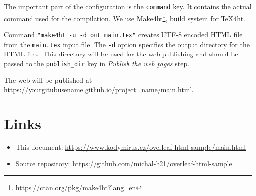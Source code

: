 \documentclass{article}
\newcommand{\1}{\mathbbm{1}}
\newcommand{\cmdname}[1]{\texttt{#1}}
\newcommand\footurl[1]{\footnote{\url{#1}}}
\newcommand\urllink[2]{#1\footurl{#2}}
\begin{document}
The important part of the configuration is the \cmdname{command} key. It
contains the actual command used for the compilation. We use
\urllink{Make4ht}{https://ctan.org/pkg/make4ht?lang=en}, build system for
\TeX4ht.

Command \verb|"make4ht -u -d out main.tex"| creates UTF-8 encoded HTML file
from the \cmdname{main.tex} input file. The \texttt{-d} option specifies the
output directory for the HTML files. This directory will be used for the web
publishing and should be passed to the \verb|publish_dir| key in
\textit{Publish the web pages} step.

The web will be published at \url{https://yourgitubusename.github.io/project_name/main.html}. 
\section{Links}
\begin{itemize}
    \item This document: \url{https://www.kodymirus.cz/overleaf-html-sample/main.html}
    \item Source repository: \url{https://github.com/michal-h21/overleaf-html-sample} 
\end{itemize}
 
\end{document}
